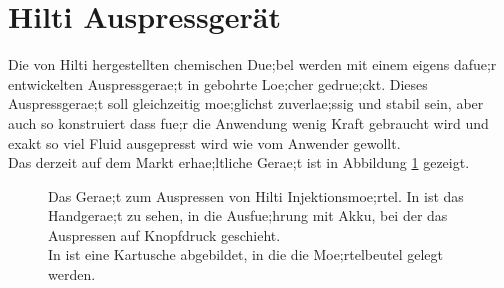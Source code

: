 \section{Hilti Auspressgerät}
\label{Kapitel:Auspressgeraet}
Die von Hilti hergestellten chemischen Due;bel werden mit einem eigens dafue;r entwickelten Auspressgerae;t in gebohrte Loe;cher gedrue;ckt. Dieses Auspressgerae;t soll gleichzeitig moe;glichst zuverlae;ssig und stabil sein, aber auch so konstruiert dass fue;r die Anwendung wenig Kraft gebraucht wird und exakt so viel Fluid ausgepresst wird wie vom Anwender gewollt.\\
Das derzeit auf dem Markt erhae;ltliche Gerae;t ist in Abbildung \ref{fig:Auspressgeraet} gezeigt.
%
\begin{figure}
    \centering
    \caption{Das Gerae;t zum Auspressen von Hilti Injektionsmoe;rtel. In  ist das Handgerae;t zu sehen, in  die Ausfue;hrung mit Akku, bei der das Auspressen auf Knopfdruck geschieht.\\
    In  ist eine Kartusche abgebildet, in die die Moe;rtelbeutel gelegt werden.}
    \label{fig:Auspressgeraet}
\end{figure}
%

